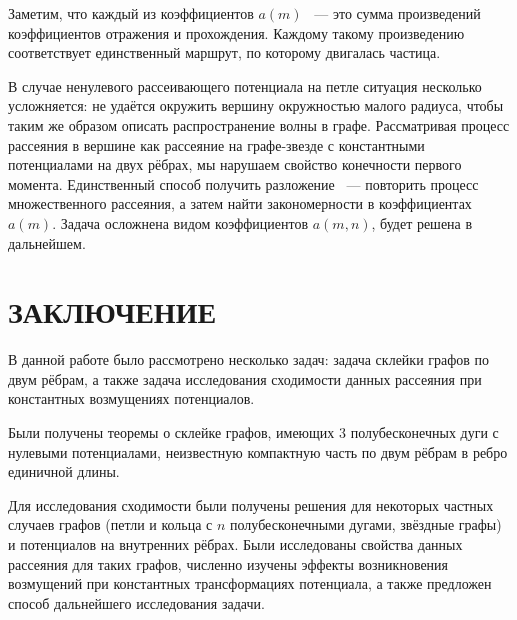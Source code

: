 \documentclass[a4 paper, 12 pt]{extarticle}
\begin{document}
   Заметим, что каждый из коэффициентов $a\left(m\right)$ ~--- это сумма произведений коэффициентов отражения и прохождения. Каждому такому произведению соответствует единственный маршрут, по которому двигалась частица.
   
   В случае ненулевого рассеивающего потенциала на петле ситуация несколько усложняется: не удаётся окружить вершину окружностью малого радиуса, чтобы таким же образом описать распространение волны в графе. Рассматривая процесс рассеяния в вершине как рассеяние на графе-звезде с константными потенциалами на двух рёбрах, мы нарушаем свойство конечности первого момента. Единственный способ получить разложение ~--- повторить процесс множественного рассеяния, а затем найти закономерности в коэффициентах $a\left(m\right)$. Задача осложнена видом коэффициентов $a\left(m,n\right)$, будет решена в дальнейшем.   
   
   \newpage
   \section{ЗАКЛЮЧЕНИЕ}
   
   В данной работе было рассмотрено несколько задач: задача склейки графов по двум рёбрам, а также задача исследования сходимости данных рассеяния при константных возмущениях потенциалов.
   
   Были получены теоремы о склейке графов, имеющих 3 полубесконечных дуги с нулевыми потенциалами, неизвестную компактную часть по двум рёбрам в ребро единичной длины. 
   
   Для исследования сходимости были получены решения для некоторых частных случаев графов (петли и кольца с $n$ полубесконечными дугами, звёздные графы) и потенциалов на внутренних рёбрах. Были исследованы свойства данных рассеяния для таких графов, численно изучены эффекты возникновения возмущений при константных трансформациях потенциала, а также предложен способ дальнейшего исследования задачи.

  
   
\end{document}
